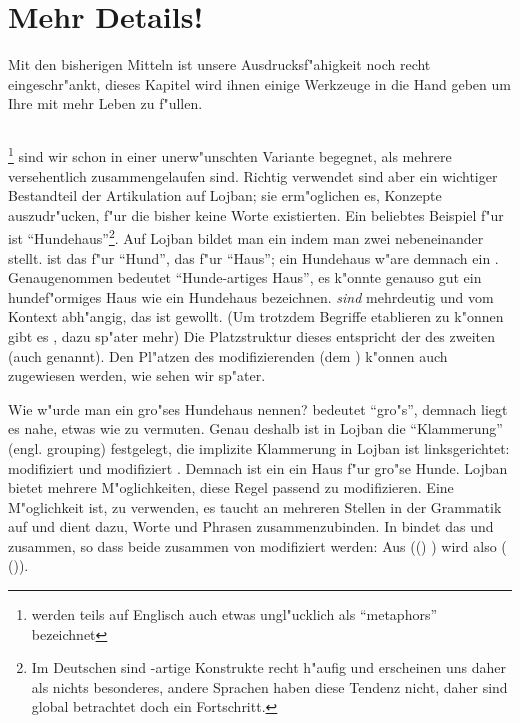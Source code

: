 \chapter{Mehr Details!}
Mit den bisherigen Mitteln ist unsere Ausdrucksf"ahigkeit noch recht eingeschr"ankt, dieses Kapitel wird ihnen einige Werkzeuge in die Hand
geben um Ihre  mit mehr Leben zu f"ullen.

\section{}
 \footnote{ werden teils auf Englisch auch etwas ungl"ucklich als ``metaphors'' bezeichnet} sind wir schon in einer unerw"unschten Variante begegnet, als mehrere  versehentlich zusammengelaufen sind. Richtig
verwendet sind  aber ein wichtiger Bestandteil der Artikulation auf Lojban; sie erm"oglichen es, Konzepte auszudr"ucken, f"ur die
bisher keine Worte existierten. Ein beliebtes Beispiel f"ur  ist ``Hundehaus''\footnote{Im Deutschen sind -artige Konstrukte
recht h"aufig und erscheinen uns daher als nichts besonderes, andere Sprachen haben diese Tendenz nicht, daher sind  global betrachtet doch ein Fortschritt.}. Auf Lojban bildet man ein  indem man zwei  nebeneinander stellt.  ist das  f"ur ``Hund'',  das f"ur ``Haus''; ein Hundehaus w"are demnach ein . Genaugenommen bedeutet 
 ``Hunde-artiges Haus'', es k"onnte genauso gut ein hundef"ormiges Haus wie ein Hundehaus bezeichnen.  \emph{sind} mehrdeutig und 
 vom Kontext abh"angig, das ist gewollt. (Um trotzdem Begriffe etablieren zu k"onnen gibt es , dazu sp"ater mehr)
Die Platzstruktur dieses  entspricht der des zweiten  (auch  genannt). Den Pl"atzen des modifizierenden
 (dem ) k"onnen auch  zugewiesen werden, wie sehen wir sp"ater.

Wie w"urde man ein gro"ses Hundehaus nennen?  bedeutet ``gro"s'', demnach liegt es nahe, etwas wie  zu vermuten.
Genau deshalb ist in Lojban die ``Klammerung'' (engl. grouping) festgelegt, die implizite Klammerung in Lojban ist linksgerichtet: 
modifiziert  und  modifiziert . Demnach ist ein  ein Haus f"ur gro"se Hunde.
Lojban bietet mehrere M"oglichkeiten, diese Regel passend zu modifizieren. Eine M"oglichkeit ist,  zu verwenden, es taucht an mehreren
Stellen in der Grammatik auf und dient dazu, Worte und Phrasen zusammenzubinden. In  bindet das  
und  zusammen, so dass beide zusammen von  modifiziert werden: Aus (() ) wird also
( ()).

